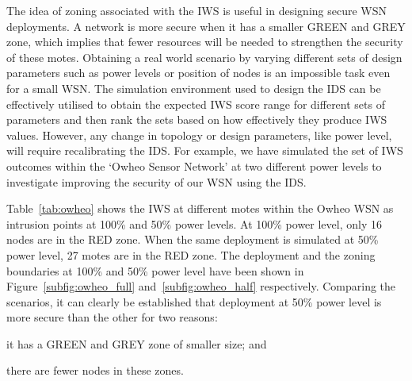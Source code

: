 \documentclass{CRPITStyle}
\begin{document}
The idea of zoning associated with the IWS is useful in designing secure WSN deployments. %
A network is more secure when it has a smaller GREEN and GREY zone, which implies that fewer resources will be needed to strengthen the security of these motes. %
Obtaining a real world scenario by varying different sets of design parameters such as power levels or position of nodes is an impossible task even for a small WSN.
The simulation environment used to design the IDS can be effectively utilised to obtain the expected IWS score range for different sets of parameters and then rank the sets based on how effectively they produce IWS values. 
However, any change in topology or design parameters, like power level, will require recalibrating the IDS. 
For example, we have simulated the set of IWS outcomes within the `Owheo Sensor Network' 
at two different power levels to investigate improving the security of our WSN using the IDS.

Table~\ref{tab:owheo} shows the IWS at different motes within the Owheo WSN as intrusion points at 100\% and 50\% power levels. 
At 100\% power level, %
only 16 nodes are in the RED zone.
When the same deployment is simulated at 50\% power level, %
27 motes are in the RED zone.
The deployment and the zoning boundaries at 100\% and  50\% power level have been shown in Figure~\ref{subfig:owheo_full} and~\ref{subfig:owheo_half} respectively.
Comparing the scenarios, it can clearly be established that deployment at 50\% power level is more secure than the other for two reasons:
\begin{inparaenum}
\item it has a GREEN and GREY zone of smaller size; and 
\item there are fewer nodes in these zones. 
\end{inparaenum}
\end{document}
